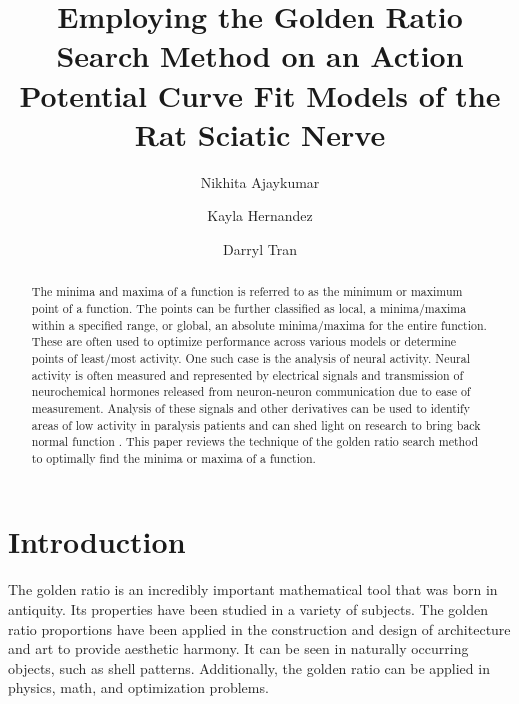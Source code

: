 \documentclass[linenumbers,RNAAS,trackchanges]{aastex631}
\begin{document}
\title{Employing the Golden Ratio Search Method on an Action Potential Curve Fit Models of the Rat Sciatic Nerve}
\correspondingauthor{}
\author{Nikhita Ajaykumar}

\author{Kayla Hernandez}


\author{Darryl Tran}

\begin{abstract}
The minima and maxima of a function is referred to as the minimum or maximum point of a function. The points can be further classified as local, a minima/maxima within a specified range, or global, an absolute minima/maxima for the entire function. These are often used to optimize performance across various models or determine points of least/most activity. One such case is the analysis of neural activity. Neural activity is often measured and represented by electrical signals and transmission of neurochemical hormones released from neuron-neuron communication due to ease of measurement. Analysis of these signals and other derivatives can be used to identify areas of low activity in paralysis patients and can shed light on research to bring back normal function \cite{5333075}
. This paper reviews the technique of the golden ratio search method to optimally find the minima or maxima of a function. 
\end{abstract}

\section{Introduction} \label{sec:intro}
The golden ratio is an incredibly important mathematical tool that was born in antiquity. Its properties have been studied in a variety of subjects. The golden ratio proportions have been applied in the construction and design of architecture and art to provide aesthetic harmony. It can be seen in naturally occurring objects, such as shell patterns. Additionally, the golden ratio can be applied in physics, math, and optimization problems.
\end{document}
